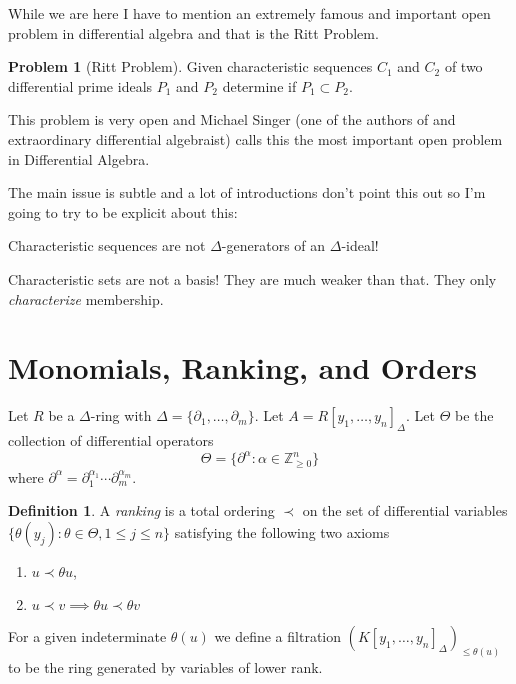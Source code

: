 \documentclass[12pt]{book}
\numberwithin{equation}{section}
\theoremstyle{definition}
\newtheorem{problem}[theorem]{Problem}
\newtheorem{definition}[theorem]{Definition}
\theoremstyle{remark}
\newcommand{\ZZ}{\mathbb{Z}}
\begin{document}
While we are here I have to mention an extremely famous and important open problem in differential algebra and that is the Ritt Problem.
\begin{problem}[Ritt Problem]
	Given characteristic sequences $C_1$ and $C_2$ of two differential prime ideals $P_1$ and $P_2$ determine if $P_1 \subset P_2$.
\end{problem}
This problem is very open and Michael Singer (one of the authors of \cite{Put2003} and extraordinary differential algebraist) calls this the most important open problem in Differential Algebra. 

The main issue is subtle and a lot of introductions don't point this out so I'm going to try to be explicit about this:
\begin{center}
Characteristic sequences are not $\Delta$-generators of an $\Delta$-ideal!
\end{center}
Characteristic sets are not a basis! They are much weaker than that. 
They only \emph{characterize} membership.

\section{Monomials, Ranking, and Orders}\label{S:PDE-ranking}
Let $R$ be a $\Delta$-ring with $\Delta = \lbrace \partial_1,\ldots,\partial_m \rbrace$.
Let $A = R[y_1,\ldots,y_n]_{\Delta}$. 
Let $\Theta$ be the collection of differential operators
$$ \Theta = \lbrace \partial^{\alpha} \colon \alpha \in \ZZ_{\geq 0}^n \rbrace$$
where $\partial^{\alpha} = \partial_1^{\alpha_1}\cdots \partial_m^{\alpha_m}$.
\begin{definition}
	A \emph{ranking} is a total ordering $\prec$ on the set of differential variables
	$ \lbrace \theta(y_j) \colon \theta \in \Theta, 1\leq j \leq n \rbrace $
	satisfying the following two axioms
	\begin{enumerate}[topsep=0pt]
		\item $ u \prec \theta u$, 
		\item $u \prec v \implies \theta u \prec \theta v $
	\end{enumerate}
\end{definition}
For a given indeterminate $\theta(u)$ we define a filtration $(K[y_1,\ldots,y_n]_{\Delta})_{\leq \theta(u)}$ to be the ring generated by variables of lower rank.
\end{document}
